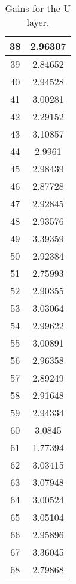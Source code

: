 \begin{table}[h]
\begin{subtable}[h]{2in}
{\begin{tabular}{|c|c|}
38	&	2.96307	\\	\hline
39	&	2.84652	\\	\hline
40	&	2.94528	\\	\hline
41	&	3.00281	\\	\hline
42	&	2.29152	\\	\hline
43	&	3.10857	\\	\hline
44	&	2.9961	\\	\hline
45	&	2.98439	\\	\hline
46	&	2.87728	\\	\hline
47	&	2.92845	\\	\hline
48	&	2.93576	\\	\hline
49	&	3.39359	\\	\hline
50	&	2.92384	\\	\hline
51	&	2.75993	\\	\hline
52	&	2.90355	\\	\hline
53	&	3.03064	\\	\hline
54	&	2.99622	\\	\hline
55	&	3.00891	\\	\hline
56	&	2.96358	\\	\hline
57	&	2.89249	\\	\hline
58	&	2.91648	\\	\hline
59	&	2.94334	\\	\hline
60	&	3.0845	\\	\hline
61	&	1.77394	\\	\hline
62	&	3.03415	\\	\hline
63	&	3.07948	\\	\hline
64	&	3.00524	\\	\hline
65	&	3.05104	\\	\hline
66	&	2.95896	\\	\hline
67	&	3.36045	\\	\hline
68	&	2.79868	\\	\hline
        \end{tabular}
        }
        \caption{Gains for the U layer.}
    \end{subtable}
    \quad
    \begin{subtable}[h]{2in}
        \centering{}
\end{subtable}
\end{table}
